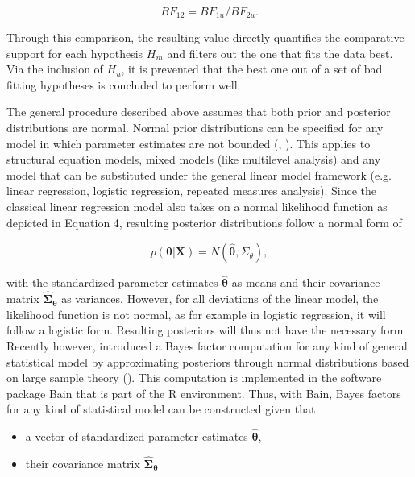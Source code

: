 \documentclass[11pt, a4paper]{article} %
\begin{document}
\begin{equation}
BF_{12} = BF_{1u}/BF_{2u}.
\end{equation} 

\noindent Through this comparison, the resulting value directly quantifies the comparative support for each hypothesis $H_m$ and filters out the one that fits the data best. Via the inclusion of $H_u$, it is prevented that the best one out of a set of bad fitting hypotheses is concluded to perform well.  

The general procedure described above assumes that both prior and posterior distributions are normal. Normal prior distributions can be specified for any model in which parameter estimates are not bounded (\cite{Gu2014}, ). This applies to structural equation models, mixed models (like multilevel analysis) and any model that can be substituted under the general linear model framework (e.g. linear regression, logistic regression, repeated measures analysis). Since the classical linear regression model also takes on a normal likelihood function as depicted in Equation 4, resulting posterior distributions follow a normal form of

\begin{equation}
p(\bm{\theta}|\bm{X}) = N(\hat{\bm{\theta}}, \hat{\Sigma}_{\theta}),
\end{equation}

\noindent with the standardized parameter estimates $\hat{\bm{\theta}}$ as means and their covariance matrix $\bm{\hat{\Sigma}_{\theta}}$ as variances. However, for all deviations of the linear model, the likelihood function is not normal, as for example in logistic regression, it will follow a logistic form. Resulting posteriors will thus not have the necessary form. Recently however, \cite{Gu2014,Gu2017} introduced a Bayes factor computation for any kind of general statistical model by approximating posteriors through normal distributions based on large sample theory (\citet{Gelman2004}). This computation is implemented in the software package \textsf{Bain} that is part of the \textsf{R} environment. Thus, with \textsf{Bain}, Bayes factors for any kind of statistical model can be constructed given that  

\begin{itemize}
	\item a vector of standardized parameter estimates $\hat{\bm{\theta}}$,
	\item their covariance matrix $\bm{\hat{\Sigma}_{\theta}}$
\end{itemize}
\end{document}
